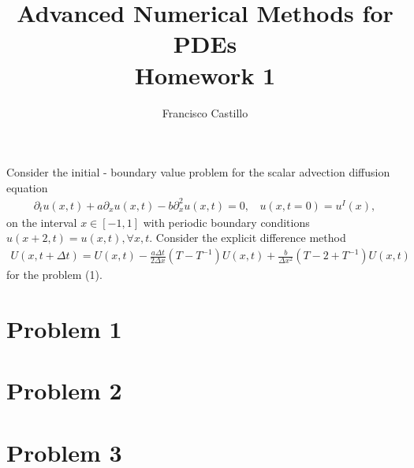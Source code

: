 \documentclass[12pt,answers]{exam}
\begin{document}
 
 
 
\title{\textbf{Advanced Numerical Methods for PDEs}\\ \Large{Homework 1}}%
\author{Francisco Castillo}
 

\maketitle
Consider the initial - boundary value problem for the scalar advection diffusion equation
\begin{align}\label{eq:PDE}
\partial_tu(x,t)+a\partial_xu(x,t)-b\partial_x^2u(x,t)=0,~~~~
u(x,t=0)=u^I(x),
\end{align}
on the interval $x\in[-1, 1]$ with periodic boundary conditions $u(x + 2, t) = u(x, t), \forall x, t$.
Consider the explicit difference method 
\begin{align}\label{eq:discrPDE}
U(x, t+\Delta t) = U(x, t)-\frac{a\Delta t}{ 2\Delta x}(T-T^{-1})U(x,t)+\frac{b}{\Delta x^2}(T-2+T^{-1})U(x, t)
\end{align}
for the problem (1).
\section*{Problem 1}

\newpage
\section*{Problem 2}
%
\newpage
\section*{Problem 3}
%




\end{document}
